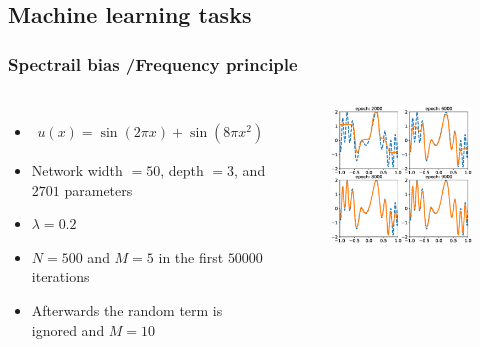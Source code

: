 \documentclass{beamer}
\begin{document}
\subsection{Machine learning tasks}
\begin{frame}
\frametitle{Spectrail bias /Frequency principle }

	\begin{columns}
	
	\begin{itemize}
		\item[] \begin{align*}
		u(x) = \sin(2\pi x) + \sin(8 \pi x ^2)
		\end{align*}
		\item Network width $ = 50$, depth $ = 3$, and $2701$ parameters 
		\item $\lambda=0.2$
		\item $N = 500$ and $M=5$ in the first $50000$ iterations
		\item Afterwards the random term is ignored and $M = 10$
	\end{itemize}
	
	\begin{figure}[ht]
		\centering
		\includegraphics[width=1.1\linewidth]{Figure//Fprinciple_exm1}
	\end{figure}	
	\end{columns}

\end{frame}
\end{document}
